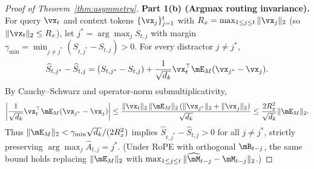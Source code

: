 \documentclass[10pt]{article} %
\begin{document}
\begin{proof}[Proof of Theorem~\ref{thm:asymmetry}]
\textbf{Part 1(b) (Argmax routing invariance).}
For query $\vx_t$ and context tokens $\{\vx_j\}_{j=1}^{t}$ with $R_x = \max_{1 \le j \le t} \|\vx_j\|_2$ (so $\|\vx_t\|_2 \le R_x$), let $j^* = \arg\max_j S_{t,j}$ with margin $\gamma_{\min} = \min_{j \ne j^*}(S_{t,j^*} - S_{t,j}) > 0$. For every distractor $j \ne j^*$,
\begin{equation}
    \widehat{S}_{t,j^*} - \widehat{S}_{t,j}
    = (S_{t,j^*} - S_{t,j}) + \frac{1}{\sqrt{d_k}} \vx_t^\top \mE_M (\vx_{j^*} - \vx_j).
\end{equation}
By Cauchy--Schwarz and operator-norm submultiplicativity,
\begin{equation}
    \left|\frac{1}{\sqrt{d_k}} \vx_t^\top \mE_M (\vx_{j^*} - \vx_j)\right|
    \le \frac{\|\vx_t\|_2\,\|\mE_M\|_2\,(\|\vx_{j^*}\|_2 + \|\vx_j\|_2)}{\sqrt{d_k}}
    \le \frac{2 R_x^2}{\sqrt{d_k}} \|\mE_M\|_2.
\end{equation}
Thus $\|\mE_M\|_2 < \gamma_{\min}\sqrt{d_k}/(2 R_x^2)$ implies $\widehat{S}_{t,j^*} - \widehat{S}_{t,j} > 0$ for all $j \ne j^*$, strictly preserving $\arg\max_j \widehat{A}_{t,j} = j^*$. (Under RoPE with orthogonal $\mR_{t-j}$, the same bound holds replacing $\|\mE_M\|_2$ with $\max_{1 \le j \le t}\|\widehat{\mM}_{t-j} - \mM_{t-j}\|_2$.)


\end{proof}
\end{document}
